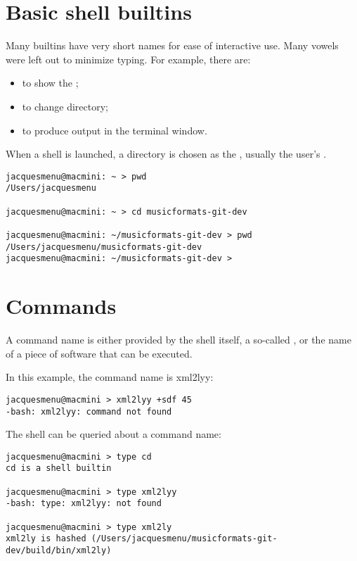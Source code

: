 \section{Basic shell builtins}

Many builtins have very short names for ease of interactive use. Many vowels were left out to minimize typing. For example, there are:
\begin{itemize}
\item {} to show the \currentWorkingDirectory;
\item {} to change directory;
\item {} to produce output in the terminal window.
\end{itemize}

When a shell is launched, a directory is chosen as the \currentWorkingDirectory, usually the user's .
\begin{lstlisting}[language=Terminal]
jacquesmenu@macmini: ~ > pwd
/Users/jacquesmenu

jacquesmenu@macmini: ~ > cd musicformats-git-dev

jacquesmenu@macmini: ~/musicformats-git-dev > pwd
/Users/jacquesmenu/musicformats-git-dev
jacquesmenu@macmini: ~/musicformats-git-dev >
\end{lstlisting}


\section{Commands}

A command name is either provided by the shell itself, a so-called , or the name of a piece of software that can be executed.

In this example, the command name is xml2lyy:
\begin{lstlisting}[language=Terminal]
jacquesmenu@macmini > xml2lyy +sdf 45
-bash: xml2lyy: command not found
\end{lstlisting}

The shell can be queried about a command name:
\begin{lstlisting}[language=Terminal]
jacquesmenu@macmini > type cd
cd is a shell builtin

jacquesmenu@macmini > type xml2lyy
-bash: type: xml2lyy: not found

jacquesmenu@macmini > type xml2ly
xml2ly is hashed (/Users/jacquesmenu/musicformats-git-dev/build/bin/xml2ly)
\end{lstlisting}


